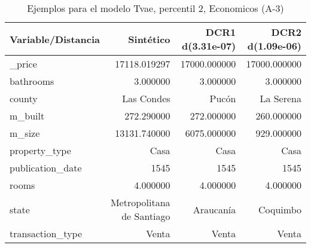 \begin{table}[H]
\centering
\fontsize{10}{14}\selectfont
\caption{Ejemplos para el modelo Tvae, percentil 2, Economicos (A-3)}
\label{table-example-economicos-a-3-tvae-2p}
\begin{tabular}{|l|r|r|r|}
\hline
\rowcolor[gray]{0.8}
Variable/Distancia & Sintético & DCR1 d(3.31e-07) & DCR2 d(1.09e-06) \\
\hline \_price & \cellcolor[rgb]{0.9, 0.54, 0.52} 17118.019297 & 17000.000000 & 17000.000000 \\
\hline bathrooms & \cellcolor[rgb]{0.9, 0.54, 0.52} 3.000000 & \cellcolor[rgb]{0.9, 0.54, 0.52} 3.000000 & \cellcolor[rgb]{0.9, 0.54, 0.52} 3.000000 \\
\hline county & \cellcolor[rgb]{0.9, 0.54, 0.52} Las Condes & Pucón & La Serena \\
\hline m\_built & \cellcolor[rgb]{0.9, 0.54, 0.52} 272.290000 & 272.000000 & 260.000000 \\
\hline m\_size & \cellcolor[rgb]{0.9, 0.54, 0.52} 13131.740000 & 6075.000000 & 929.000000 \\
\hline property\_type & \cellcolor[rgb]{0.9, 0.54, 0.52} Casa & \cellcolor[rgb]{0.9, 0.54, 0.52} Casa & \cellcolor[rgb]{0.9, 0.54, 0.52} Casa \\
\hline publication\_date & \cellcolor[rgb]{0.9, 0.54, 0.52} 1545 & \cellcolor[rgb]{0.9, 0.54, 0.52} 1545 & \cellcolor[rgb]{0.9, 0.54, 0.52} 1545 \\
\hline rooms & \cellcolor[rgb]{0.9, 0.54, 0.52} 4.000000 & \cellcolor[rgb]{0.9, 0.54, 0.52} 4.000000 & \cellcolor[rgb]{0.9, 0.54, 0.52} 4.000000 \\
\hline state & \cellcolor[rgb]{0.9, 0.54, 0.52} Metropolitana de Santiago & Araucanía & Coquimbo \\
\hline transaction\_type & \cellcolor[rgb]{0.9, 0.54, 0.52} Venta & \cellcolor[rgb]{0.9, 0.54, 0.52} Venta & \cellcolor[rgb]{0.9, 0.54, 0.52} Venta \\
\hline
\end{tabular}
\end{table}
